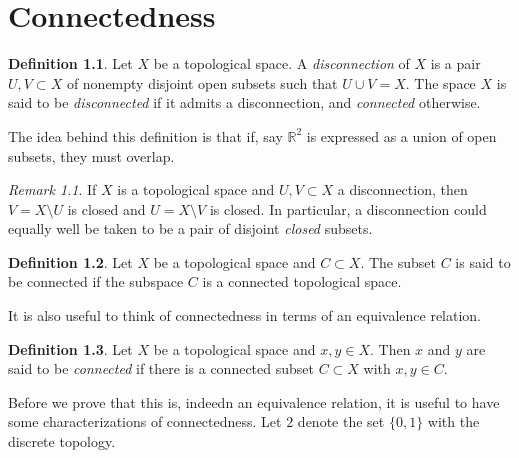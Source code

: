 \documentclass{book}
\theoremstyle{definition}
\newtheorem{definition}{Definition}[section]
\theoremstyle{remark}
\newtheorem{remark}{Remark}[section]
\newcommand{\R}{\mathbb{R}}
\begin{document}
\chapter{Connectedness}

\begin{definition}
Let $X$ be a topological space. A \textit{disconnection} of $X$ is a pair $U,V\subset X$ of nonempty disjoint open subsets such that $U\cup V=X$. The space $X$ is said to be \textit{disconnected} if it admits a disconnection, and \textit{connected} otherwise.
\end{definition}

The idea behind this definition is that if, say $\R^2$ is expressed as a union of open subsets, they must overlap.

\begin{remark}
If $X$ is a topological space and $U,V\subset X$ a disconnection, then $V=X\setminus U$ is closed and $U=X\setminus V$ is closed. In particular, a disconnection could equally well be taken to be a pair of disjoint \textit{closed} subsets.
\end{remark}

\begin{definition}
Let $X$ be a topological space and $C\subset X$. The subset $C$ is said to be connected if the subspace $C$ is a connected topological space.
\end{definition}

It is also useful to think of connectedness in terms of an equivalence relation.

\begin{definition}
Let $X$ be a topological space and $x,y\in X$. Then $x$ and $y$ are said to be \textit{connected} if there is a connected subset $C\subset X$ with $x,y\in C$.
\end{definition}

Before we prove that this is, indeedn an equivalence relation, it is useful to have some characterizations of connectedness. Let $2$ denote the set $\{0,1\}$ with the discrete topology.
\end{document}
